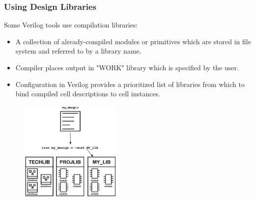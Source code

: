 \documentclass[t, notes]{beamer}
\begin{document}
\begin{frame}
\frametitle{Using Design Libraries}

Some Verilog tools use compilation libraries:
\begin{itemize}
\item A collection of already-compiled modules or primitives which are stored in file system and referred to by a library name.
\item Compiler places output in "WORK" library which is specified by the user.
\item Configuration in Verilog provides a prioritized list of libraries from which to bind compiled cell descriptions to cell instances.
\end{itemize}

\begin{figure}[H!]
    \includegraphics[width=0.45\textwidth]{img/03_design.png}
\end{figure}

\end{frame}
\end{document}
